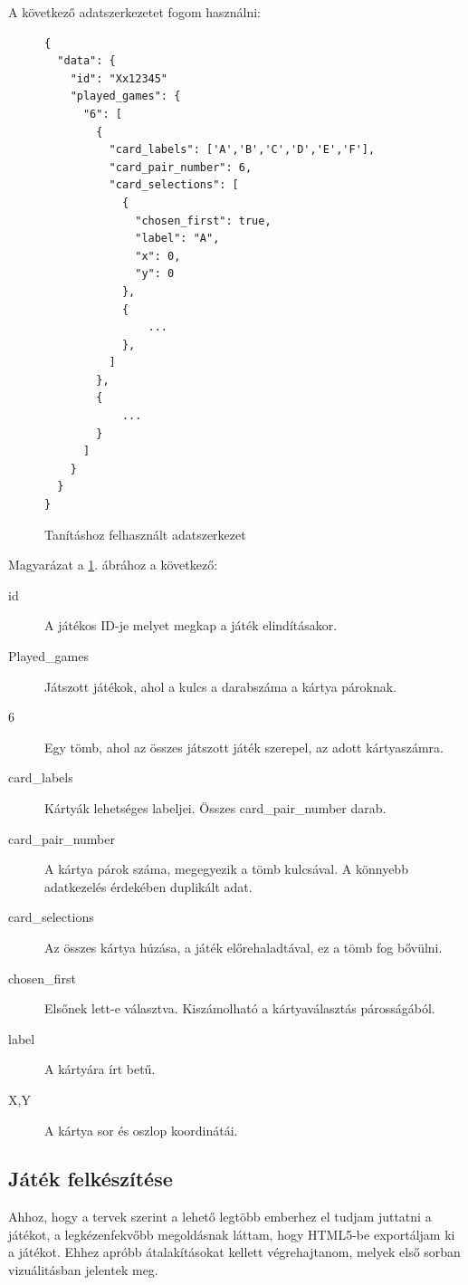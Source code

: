A következő adatszerkezetet fogom használni: 

\begin{figure}[h]
\centering
 \begin{lstlisting}
{
  "data": { 
    "id": "Xx12345"
    "played_games": {
      "6": [
        {
          "card_labels": ['A','B','C','D','E','F'], 
          "card_pair_number": 6,
          "card_selections": [ 
            {
              "chosen_first": true,
              "label": "A",
              "x": 0,
              "y": 0
            },
            {
                ...
            },
          ]
        },
        {
            ...
        }
      ]
    }
  }
}
\end{lstlisting}
\caption{Tanításhoz felhasznált adatszerkezet}
\label{saveJson}
\end{figure}


Magyarázat a \ref{saveJson}. ábrához a következő:
\begin{description}
    \item[id] A játékos ID-je melyet megkap a játék elindításakor. 
    \item[Played\_games] Játszott játékok, ahol a kulcs a darabszáma a kártya pároknak.
    \item[6\:] Egy tömb, ahol az összes játszott játék szerepel, az adott kártyaszámra.
    \item[card\_labels\:] Kártyák lehetséges labeljei. Összes card\_pair\_number darab.
    \item[card\_pair\_number\:] A kártya párok száma, megegyezik a tömb kulcsával. A könnyebb adatkezelés érdekében duplikált adat.
    \item[card\_selections\:] Az összes kártya húzása, a játék előrehaladtával, ez a tömb fog bővülni. 
    \item[chosen\_first\:] Elsőnek lett-e választva. Kiszámolható a kártyaválasztás párosságából.
    \item[label\:] A kártyára írt betű.
    \item[X,Y\:] A kártya sor és oszlop koordinátái.
\end{description}
\subsection{Játék felkészítése}
Ahhoz, hogy a tervek szerint a lehető legtöbb emberhez el tudjam juttatni a játékot, a legkézenfekvőbb megoldásnak láttam, hogy HTML5-be exportáljam ki a játékot. 
Ehhez apróbb átalakításokat kellett végrehajtanom, melyek első sorban vizuálitásban jelentek meg. 

